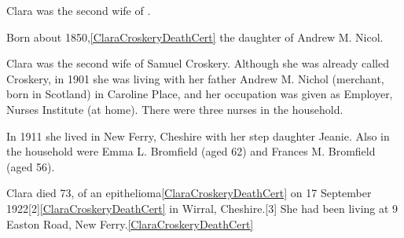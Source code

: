 
Clara was the second wife of .

Born about 1850,\ref{ClaraCroskeryDeathCert} the daughter of Andrew M. Nicol.

Clara was the second wife of Samuel Croskery.
Although she was already called Croskery,
in 1901 she was living with her father Andrew M. Nichol (merchant, born in Scotland) in Caroline Place, and her occupation was given as Employer, Nurses Institute (at home).
There were three nurses in the household.

In 1911 she lived in New Ferry, Cheshire with her step daughter Jeanie. Also in the household were Emma L. Bromfield (aged 62) and Frances M. Bromfield (aged 56).

Clara died 73, of an epithelioma\ref{ClaraCroskeryDeathCert} on 17 September 1922[2]\ref{ClaraCroskeryDeathCert} in Wirral, Cheshire.[3]
She had been living at 9 Easton Road, New Ferry.\ref{ClaraCroskeryDeathCert}
